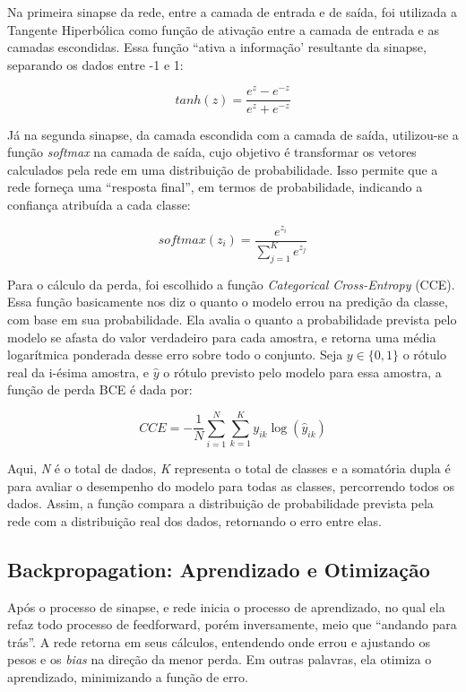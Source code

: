 \documentclass[12pt]{article}
\begin{document}
Na primeira sinapse da rede, entre a camada de entrada e de saída, foi utilizada a Tangente Hiperbólica como função de ativação entre a camada de entrada e as camadas escondidas. Essa função “ativa a informação’ resultante da sinapse, separando os dados entre -1 e 1:


\begin{equation}
    tanh(z) = \frac{e^z - e^{-z}}{e^z + e^{-z}}
\end{equation}

Já na segunda sinapse, da camada escondida com a camada de saída, utilizou-se a função \textit{softmax} na camada de saída, cujo objetivo é transformar os vetores calculados pela rede em uma distribuição de probabilidade. Isso permite que a rede forneça uma “resposta final”, em termos de probabilidade, indicando a confiança atribuída a cada classe:

\begin{equation}
    {softmax}(z_i) = \frac{e^{z_i}}{\sum_{j=1}^K e^{z_j}}
\end{equation}

Para o cálculo da perda, foi escolhido a função \textit{Categorical Cross-Entropy} (CCE). Essa função basicamente nos diz o quanto o modelo errou na predição da classe, com base em sua probabilidade. Ela avalia o quanto a probabilidade prevista pelo modelo se afasta do valor verdadeiro para cada amostra, e retorna uma média logarítmica ponderada desse erro sobre todo o conjunto. Seja \( y \in \{0, 1\} \) o rótulo real da i-ésima amostra, e \( \hat{y} \) o rótulo previsto pelo modelo para essa amostra, a função de perda BCE é dada por:

\begin{equation}
    CCE = -\frac{1}{N} \sum_{i=1}^N \sum_{k=1}^K y_{ik} \log(\hat{y}_{ik})
\end{equation}

Aqui, \textit{N} é o total de dados, \textit{K} representa o total de classes e a somatória dupla é para avaliar o desempenho do modelo para todas as classes, percorrendo todos os dados. Assim, a função compara a distribuição de probabilidade prevista pela rede com a distribuição real dos dados, retornando o erro entre elas.


\subsection{Backpropagation: Aprendizado e Otimização}

Após o processo de sinapse, e rede inicia o processo de aprendizado, no qual ela refaz todo processo de feedforward, porém inversamente, meio que “andando para trás”. A rede retorna em seus cálculos, entendendo onde errou e ajustando os pesos e os \textit{bias} na direção da menor perda. Em outras palavras, ela otimiza o aprendizado, minimizando a função de erro.
\end{document}
